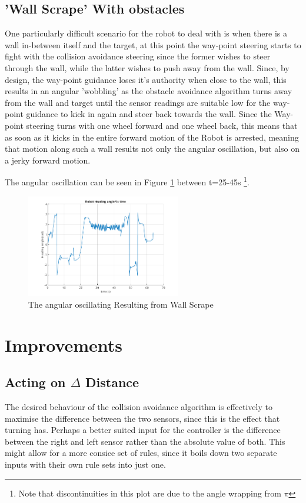 \documentclass[11pt]{article}
\numberwithin{equation}{section}
\begin{document}
\subsection{'Wall Scrape' With obstacles \label{wallScrape}}
\label{sec:org5693532}
One particularly difficult scenario for the robot to deal with is when there is a wall in-between itself and the target, at this point the way-point steering starts to fight with the collision avoidance steering since the former wishes to steer through the wall, while the latter wishes to push away from the wall. Since, by design, the way-point guidance loses it's authority when close to the wall, this results in an angular 'wobbling' as the obstacle avoidance algorithm turns away from the wall and target until the sensor readings are suitable low for the way-point guidance to kick in again and steer back towards the wall. Since the Way-point steering turns with one wheel forward and one wheel back, this means that as soon as it kicks in the entire forward motion of the Robot is arrested, meaning that motion along such a wall results not only the angular oscillation, but also on a jerky forward motion.

The angular oscillation can be seen in Figure \ref{figAngluarOscilationWallScrape} between t=25-45s \footnote{Note that discontinuities in this plot are due to the angle wrapping from \textpm{} \(\pi\)}.

\begin{figure}[H]
\centering
\includegraphics[width=0.6\textwidth]{Section3/Figures/FinalFigures/psiVtCustom_HomingWP_Task2task2Walls.png}
\caption{\label{figAngluarOscilationWallScrape}The angular oscillating Resulting from Wall Scrape}
\end{figure}

\section{Improvements}
\label{sec:orgcc22daa}
\subsection{Acting on \(\Delta\) Distance}
\label{sec:orga60a253}
The desired behaviour of the collision avoidance algorithm is effectively to maximise the difference between the two sensors, since this is the effect that turning has. Perhaps a better suited input for the controller is the difference between the right and left sensor rather than the absolute value of both. This might allow for a more consice set of rules, since it boils down two separate inputs with their own rule sets into just one.
\end{document}
